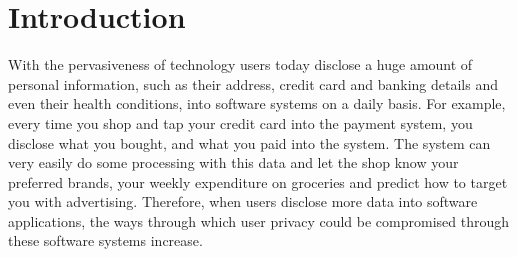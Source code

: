\documentclass[conference]{IEEEtran}
\begin{document}
\maketitle

\begin{abstract}


\end{abstract}


%
\IEEEpeerreviewmaketitle

\section{Introduction}
With the pervasiveness of technology users today disclose a huge amount of personal information, such as their address, credit card and banking details and even their health conditions, into software systems on a daily basis. For example, every time you shop and tap your credit card into the payment system, you disclose what you bought, and what you paid into the system. The system can very easily do some processing with this data and let the shop know your preferred brands, your weekly expenditure on groceries and predict how to target you with advertising. Therefore, when users disclose more data into software applications, the ways through which user privacy could be compromised through these software systems increase. 
\end{document}
